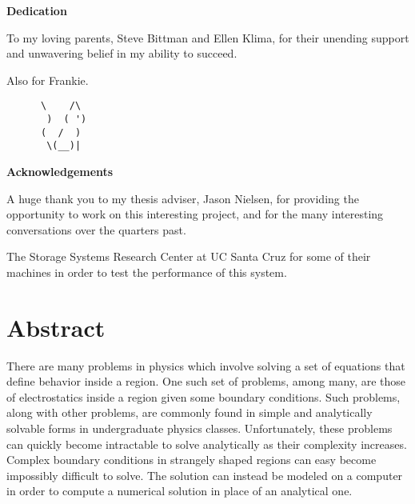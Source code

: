\documentclass[12pt]{article}
\begin{document}
\begin{addmargin}[8em]{8em}
\begin{center}

	\textbf{Dedication}
	\vspace{50mm}

	To my loving parents, Steve Bittman and Ellen Klima, for their unending support
	and unwavering belief in my ability to succeed.

	\vspace{100mm}
	Also for Frankie.
\end{center}

\begin{addmargin}[6.2em]{8em}
\begin{verbatim}
      \    /\
       )  ( ')
      (  /  )
       \(__)|
\end{verbatim}
\end{addmargin}
\end{addmargin}
\clearpage
\begin{center}
	\textbf{Acknowledgements}
	\vspace{50mm}

	A huge thank you to my thesis adviser, Jason Nielsen, for providing the opportunity
	to work on this interesting project, and for the many interesting conversations over
	the quarters past.

	\vspace{10mm}
	The Storage Systems Research Center at UC Santa Cruz for some of their machines in order
	to test the performance of this system.

\end{center}
\clearpage
\restoregeometry
\tableofcontents
\clearpage
\listoffigures
\listoftables
\clearpage
\renewcommand{\lstlistlistingname}{List of Source Code Listings}
\lstlistoflistings
\clearpage

\renewcommand{\thepage}{\arabic{page}}
\setcounter{page}{1}
\section*{Abstract}

\onehalfspacing

There are many problems in physics which involve solving a set of equations that define behavior
inside a region. One such set of problems, among many, are those of electrostatics inside
a region given some boundary conditions. Such problems, along with other
problems, are commonly found in simple and analytically solvable forms in undergraduate physics classes.
Unfortunately, these problems can quickly become intractable to solve analytically as their complexity
increases. Complex boundary conditions in strangely shaped regions can easy become impossibly difficult to
solve. The solution can instead be modeled on a computer in order to compute a numerical solution
in place of an analytical one.
\end{document}
